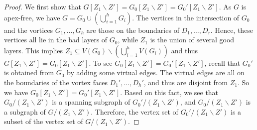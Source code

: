\documentclass[a4paper,11pt]{article}
\numberwithin{lemma}{section}
\begin{document}
\begin{proof}
We first show that $G[Z_1 \backslash Z'] = G_0[Z_1 \backslash Z'] = G_0'[Z_1 \backslash Z']$.
As $G$ is apex-free, we have $G = G_0 \cup (\bigcup_{i=1}^h G_i)$.
The vertices in the intersection of $G_0$ and the vortices $G_1,\dots,G_h$ are those on the boundaries of $D_1,\dots,D_r$.
Hence, these vertices all lie in the bad layers of $G_0$, while $Z_1$ is the union of several good layers.
This implies $Z_1 \subseteq V(G_0) \backslash (\bigcup_{i=1}^h V(G_i))$ and thus $G[Z_1 \backslash Z'] = G_0[Z_1 \backslash Z']$.
To see $G_0[Z_1 \backslash Z'] = G_0'[Z_1 \backslash Z']$, recall that $G_0'$ is obtained from $G_0$ by adding some virtual edges.
The virtual edges are all on the boundaries of the vortex faces $D_1',\dots,D_h'$, and thus are disjoint from $Z_1$.
So we have $G_0[Z_1 \backslash Z'] = G_0'[Z_1 \backslash Z']$.
Based on this fact, we see that $G_0/(Z_1 \backslash Z')$ is a spanning subgraph of $G_0'/(Z_1 \backslash Z')$, and $G_0/(Z_1 \backslash Z')$ is a subgraph of $G/(Z_1 \backslash Z')$.
Therefore, the vertex set of $G_0'/(Z_1 \backslash Z')$ is a subset of the vertex set of $G/(Z_1 \backslash Z')$.


\end{proof}
\end{document}
